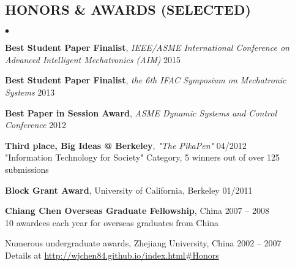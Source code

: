 \documentclass{res}
\begin{document}
\begin{resume}
\section{HONORS \& AWARDS (SELECTED)}
\vspace{0.2in}

\begin{list}{$\bullet$}{\setlength\leftmargin{0in}\setlength\topsep{0in}}
\item \textbf{Best Student Paper Finalist}, \emph{IEEE/ASME International Conference on Advanced Intelligent Mechatronics (AIM)} \hfill{2015}
\item \textbf{Best Student Paper Finalist}, \emph{the 6th IFAC Symposium on Mechatronic Systems} \hfill{2013}
\item \textbf{Best Paper in Session Award}, \emph{ASME Dynamic Systems and Control Conference} \hfill{2012}
\item \textbf{Third place, Big Ideas @ Berkeley}, \emph{"The PikaPen"} \hfill{04/2012} \\
"Information Technology for Society" Category, 5 winners out of over 125 submissions
\item \textbf{Block Grant Award}, University of California, Berkeley \hfill{01/2011}
\item \textbf{Chiang Chen Overseas Graduate Fellowship}, China \hfill{2007 -- 2008}\\
10 awardees each year for overseas graduates from China
\item Numerous undergraduate awards, Zhejiang University, China \hfill{2002 -- 2007}\\
Details at \url{http://wjchen84.github.io/index.html#Honors}
\end{list}


\end{resume}
\end{document}
